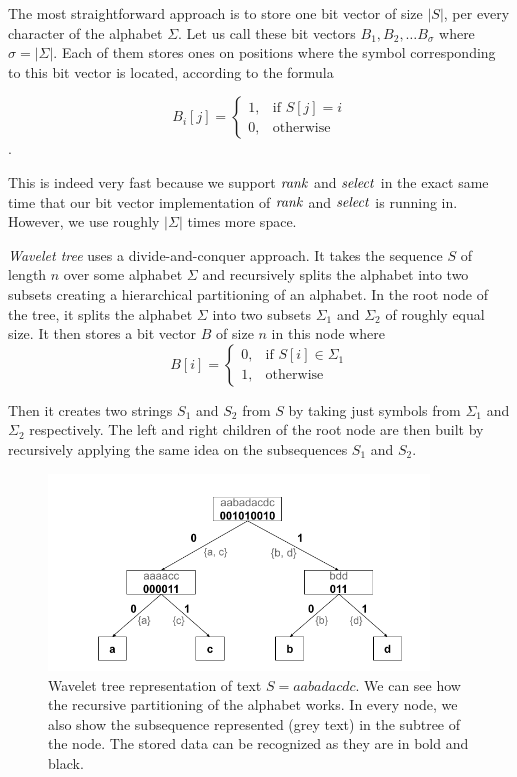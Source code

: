 The most straightforward approach is to store one bit vector of size $|S|$,
per every character of the alphabet $\Sigma$. Let us call these bit vectors $B_1,
B_2, \ldots B_{\sigma}$ where $\sigma=|\Sigma|$. Each of them stores ones on positions
where the symbol corresponding to this bit vector is located, according to the formula

\[
    B_i[j]= 
\begin{cases}
	1,& \text{if } S[j]=i \\
    0,& \text{otherwise}
\end{cases}
\].

This is indeed very fast because we support $\mathit{rank}$ and $\mathit{select}$ in the exact same time
that our bit vector implementation of $\mathit{rank}$ and $\mathit{select}$ is running in. However, we use
roughly $|\Sigma|$ times more space.

\textit{Wavelet tree} uses a divide-and-conquer approach. It takes the sequence $S$ of
length $n$ over some alphabet $\Sigma$ and recursively splits the alphabet into
two subsets creating a hierarchical partitioning of an alphabet. In the root node
of the tree, it splits the alphabet $\Sigma$ into two subsets $\Sigma_1$ and $\Sigma_2$
of roughly equal size. It then stores a bit vector $B$ of size $n$ in this node
where
\[
    B[i]= 
\begin{cases}
    0,& \text{if } S[i]\in \Sigma_1\\
    1,              & \text{otherwise}
\end{cases}
\]

Then it creates two strings $S_1$ and $S_2$ from $S$ by taking just symbols
from $\Sigma_1$ and $\Sigma_2$ respectively. The left and right children of the root node
are then built by recursively applying the same idea on the subsequences $S_1$ and $S_2$.

\begin{figure}
	\centerline{
		\includegraphics[width=0.9\textwidth, height=0.3\textheight]{images/wavelet_tree}
	}
	\caption[TODO]{Wavelet tree representation of text $S=\mathit{aabadacdc}$. We can see how
	the recursive partitioning of the alphabet works. In every node, we also show the
	subsequence represented (grey text) in the subtree of the node. The stored data can be
	recognized as they are in bold and black.
	}
	\label{obr:WaveletTreeExample}
\end{figure}


